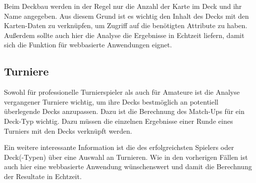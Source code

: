 Beim Deckbau werden in der Regel nur die Anzahl der Karte im Deck und ihr Name angegeben. Aus diesem Grund ist es wichtig den Inhalt des Decks mit den Karten-Daten zu verknüpfen, um Zugriff auf die benötigten Attribute zu haben. Außerdem sollte auch hier die Analyse die Ergebnisse in Echtzeit liefern, damit sich die Funktion für webbasierte Anwendungen eignet.

\subsection{Turniere}
Sowohl für professionelle Turnierspieler als auch für Amateure ist die Analyse vergangener Turniere wichtig, um ihre Decks bestmöglich an potentiell überlegende Decks anzupassen. Dazu ist die Berechnung des Match-Ups für ein Deck-Typ wichtig. Dazu müssen die einzelnen Ergebnisse einer Runde eines Turniers mit den Decks verknüpft werden.

Ein weitere interessante Information ist die des erfolgreichsten Spielers oder Deck(-Typen) über eine Auswahl an Turnieren. Wie in den vorherigen Fällen ist auch hier eine webbasierte Anwendung wünschenswert und damit die Berechnung der Resultate in Echtzeit.

